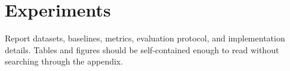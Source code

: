 \section{Experiments}

Report datasets, baselines, metrics, evaluation protocol, and implementation
details. Tables and figures should be self-contained enough to read without
searching through the appendix.
